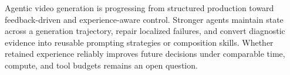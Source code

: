 \begin{keytakeaway}
Agentic video generation is progressing from structured production toward feedback-driven and experience-aware control. Stronger agents maintain state across a generation trajectory, repair localized failures, and convert diagnostic evidence into reusable prompting strategies or composition skills. Whether retained experience reliably improves future decisions under comparable time, compute, and tool budgets remains an open question.
\end{keytakeaway}

\FloatBarrier
